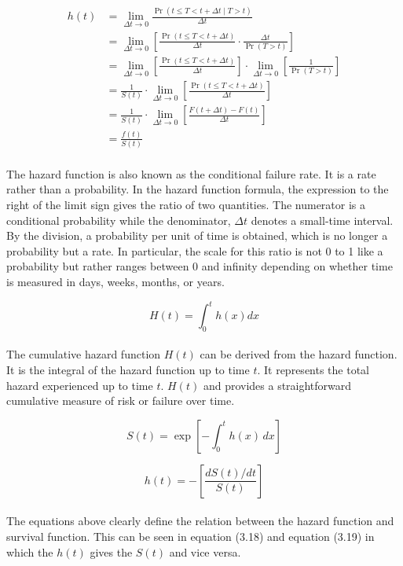 \documentclass[doublespacing,12pt]{report}
\begin{document}
\begin{align}
h(t) &= \lim_{\Delta t \to 0} \frac{\Pr(t \leq T < t + \Delta t \mid T > t)}{\Delta t} \\
&= \lim_{\Delta t \to 0} \left[ \frac{\Pr(t \leq T < t + \Delta t)}{\Delta t} \cdot \frac{\Delta t}{\Pr(T > t)} \right] \\
&= \lim_{\Delta t \to 0} \left[ \frac{\Pr(t \leq T < t + \Delta t)}{\Delta t} \right] \cdot \lim_{\Delta t \to 0} \left[ \frac{1}{\Pr(T > t)} \right] \\
&= \frac{1}{S(t)} \cdot \lim_{\Delta t \to 0} \left[ \frac{\Pr(t \leq T < t + \Delta t)}{\Delta t} \right] \\
&= \frac{1}{S(t)} \cdot \lim_{\Delta t \to 0} \left[ \frac{F(t + \Delta t) - F(t)}{\Delta t} \right] \\
&= \frac{f(t)}{S(t)} 
\end{align}\\
The hazard function is also known as the conditional failure rate. It is a rate rather than a probability. In the hazard function formula, the expression to the right of the limit sign gives the ratio of two quantities. The numerator is a conditional probability while the denominator, \(\Delta t\) denotes a small-time interval. By the division, a probability per unit of time is obtained, which is no longer a probability but a rate. In particular, the scale for this ratio is not 0 to 1 like a probability but rather ranges between 0 and infinity depending on whether time is measured in days, weeks, months, or years. 

\begin{equation}
H(t)=\int_{0}^{t}{h(x)dx}
\end{equation}\\
The cumulative hazard function \(H(t)\) can be derived from the hazard function. It is the integral of the hazard function up to time \(t\). It represents the total hazard experienced up to time \( t.\) \( H(t)\) and provides a straightforward cumulative measure of risk or failure over time.

\begin{equation}
S(t) = \exp\left[-\int_{0}^{t} h(x) \, dx\right]
\label{eq:survival_function}
\end{equation}

\begin{equation}
h(t) = -\left[\frac{dS(t)/dt}{S(t)}\right]
\end{equation}\\
The equations above clearly define the relation between the hazard function and survival function. This can be seen in equation (3.18) and equation (3.19) in which the $h(t)$ gives the $S(t)$ and vice versa.
\end{document}
